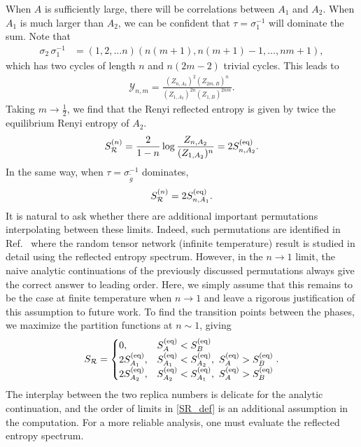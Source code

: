 \documentclass[a4paper,11pt]{article}
\newcommand\half{{\ensuremath{\frac{1}{2}}}}
\newcommand{\be}{\begin{equation}}
\newcommand{\ee}{\end{equation}}
\newcommand\ha{{\half}}
\newcommand\sR{{\mathcal R}}
\newcommand\sY{{\mathcal Y}}
\begin{document}
When $A$ is sufficiently large, there will be correlations between $A_1$ and $A_2$. When $A_1$ is much larger than $A_2$, we can be confident that $\tau =\sigma_{{1}}^{-1} $ will dominate the sum. %
Note that 
\begin{align}
 {\sigma}_{{2}}\, \sigma_{{1}}^{-1}&= (1,2,\dots n)(n(m+1),n(m+1)-1,\dots, nm+1),
\end{align}
which has two cycles of length $n$ and $n(2m-2)$ trivial cycles. This leads to
\begin{align}
 \sY_{n,m} = \frac{(Z_{n,A_2})^2(Z_{2m,B})^n}{(Z_{1,A_2})^{2n}(Z_{1,B})^{2nm}}.
\end{align}
Taking $m\rightarrow \ha$, we find that the Renyi reflected entropy is given by twice the equilibrium Renyi entropy of $A_2$.
\begin{align}
 S_{\sR}^{(n)} = \frac{2}{1-n} \log \frac{Z_{n,A_2}}{(Z_{1,A_2})^{n}} = 2 S^{\rm (eq)}_{n, A_2}.
\end{align}
In the same way, when $\tau =\sigma_{\tilde{g}}^{-1} $ dominates, \begin{align}
 S_{\sR}^{(n)} = 2 S^{\rm (eq)}_{n,A_1}.
\end{align}
It is natural to ask whether there are additional important permutations interpolating between these limits. Indeed, such permutations are identified in Ref.~\cite{SR_RTN1, SR_RTN2} where the random tensor network (infinite temperature) result is studied in detail using the reflected entropy spectrum. However, in the $n\rightarrow 1$ limit, the naive analytic continuations of the previously discussed permutations always give the correct answer to leading order. Here, we simply assume that this remains to be the case at finite temperature when $n\rightarrow 1$ and leave a rigorous justification of this assumption to future work. 
To find the transition points between the phases, we maximize the partition functions at $n \sim 1$, giving
\be
 S_{\sR} %
 =\begin{cases}
 0, & S^{\rm (eq)}_A < S^{\rm (eq)}_B
 \\
 2S^{\rm (eq)}_{A_1}, & S^{\rm (eq)}_{A_1} < S^{\rm (eq)}_{A_2},~ S^{\rm (eq)}_A > S^{\rm (eq)}_B
 \\
 2S^{\rm (eq)}_{A_2}, & S^{\rm (eq)}_{A_2}< S^{\rm (eq)}_{A_1},~ S^{\rm (eq)}_A > S^{\rm (eq)}_B
 \end{cases}.
\ee
The interplay between the two replica numbers is delicate for the analytic continuation, and the order of limits in \eqref{SR_def} is an additional assumption in the computation. For a more reliable analysis, one must evaluate the reflected entropy spectrum.
\end{document}
